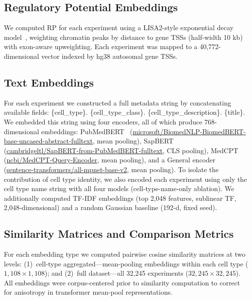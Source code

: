 \documentclass[conference]{IEEEtran}
\begin{document}
\subsection{Regulatory Potential Embeddings}

We computed RP for each experiment using a LISA2-style exponential decay
model~\cite{lisa2}, weighting chromatin peaks by distance to gene TSSs
(half-width 10 kb) with exon-aware upweighting. Each experiment was mapped
to a 40,772-dimensional vector indexed by hg38 autosomal gene TSSs.

\subsection{Text Embeddings}

For each experiment we constructed a full metadata string by concatenating
available fields: \{cell\_type\}. \{cell\_type\_class\}.
\{cell\_type\_description\}. \{title\}. We embedded this string using four
encoders, all of which produce 768-dimensional embeddings:
PubMedBERT~\cite{pubmedbert}
(\url{microsoft/BiomedNLP-BiomedBERT-base-uncased-abstract-fulltext}, mean
pooling), SapBERT~\cite{sapbert}
(\url{cambridgeltl/SapBERT-from-PubMedBERT-fulltext}, CLS pooling),
MedCPT~\cite{medcpt} (\url{ncbi/MedCPT-Query-Encoder}, mean
pooling), and a General encoder~\cite{mpnet}
(\url{sentence-transformers/all-mpnet-base-v2}, mean pooling). To isolate
the contribution of cell type identity, we also encoded each experiment using
only the cell type name string with all four models (cell-type-name-only
ablation). We additionally computed TF-IDF embeddings (top 2,048
features, sublinear TF, 2,048-dimensional) and a random Gaussian
baseline (192-d, fixed seed).

\subsection{Similarity Matrices and Comparison Metrics}
\label{sec:metrics}

For each embedding type we computed pairwise cosine similarity matrices at two
levels: (1)~cell-type aggregated---mean-pooling embeddings within
each cell type ($1{,}108 \times 1{,}108$); and (2)~full
dataset---all 32,245 experiments ($32{,}245 \times 32{,}245$). All
embeddings were corpus-centered prior to similarity computation to correct for
anisotropy in transformer mean-pool representations.
\end{document}
